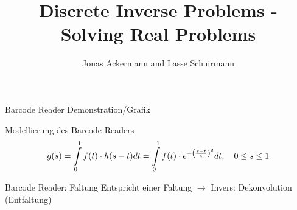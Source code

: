\documentclass[11pt]{beamer}
\author{Jonas Ackermann and Lasse Schuirmann}
\title{Discrete Inverse Problems - Solving Real Problems}
\begin{document}
\begin{frame}
\titlepage
\end{frame}

\begin{frame}
\tableofcontents
\end{frame}

\begin{frame}{Barcode Reader}
Demonstration/Grafik
\end{frame}

\begin{frame}{Modellierung des Barcode Readers}
\[g(s) = \int\limits_{0}^1 f(t) \cdot h(s-t) dt = \int\limits_{0}^1 f(t) \cdot e^{-\left(s-t \over \varsigma\right)^2} dt, \, \, \, \, \, \, 0 \leq s \leq 1 \]
\end{frame}

\begin{frame}{Barcode Reader: Faltung}
Entspricht einer Faltung $\rightarrow$ Invers: Dekonvolution (Entfaltung) 
\end{frame}

\begin{frame}{}

\end{frame}
\end{document}
